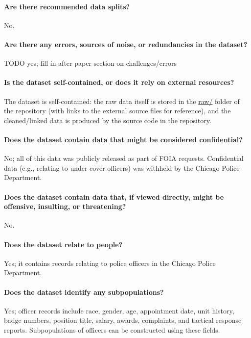\paragraph{Are there recommended data splits?}
No.

\paragraph{Are there any errors, sources of noise, or redundancies in the dataset?}
{\color{red} TODO yes; fill in after paper section on challenges/errors}

\paragraph{Is the dataset self-contained, or does it rely on external resources?}
The dataset is self-contained: the raw data itself is stored in the \url{raw/} folder of the repository 
(with links to the external source files for reference), 
and the cleaned/linked data is produced by the source code in the repository.

\paragraph{Does the dataset contain data that might be considered confidential?}
No; all of this data was publicly released as part of FOIA requests. 
Confidential data (e.g., relating to under cover officers) was withheld 
by the Chicago Police Department.

\paragraph{Does the dataset contain data that, if viewed directly, might be offensive, insulting, or threatening?}
No.

\paragraph{Does the dataset relate to people?} 
Yes; it contains records relating to police officers in the Chicago Police Department.

\paragraph{Does the dataset identify any subpopulations?}
Yes; officer records include race, gender, age, appointment date, unit history, badge numbers, position title,
salary, awards, complaints, and tactical response reports. Subpopulations of officers can be constructed
using these fields.

